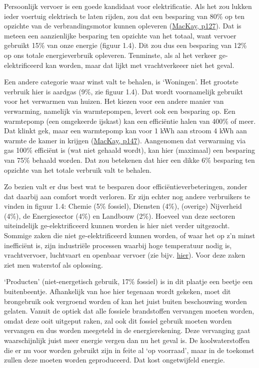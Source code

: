 \documentclass[
  11pt,
  a4paper,
]{book}
\begin{document}
Persoonlijk vervoer is een goede kandidaat voor elektrificatie. Als het zou lukken ieder voertuig elektrisch te laten rijden, zou dat een besparing van 80\% op ten opzichte van de verbrandingsmotor kunnen opleveren (\href{https://www.withouthotair.com/download.html}{MacKay, p127}). Dat is meteen een aanzienlijke besparing ten opzichte van het totaal, want vervoer gebruikt 15\% van onze energie (figuur 1.4). Dit zou dus een besparing van 12\% op ons totale energieverbruik opleveren. Tenminste, als al het verkeer ge-elektrificeerd kan worden, maar dat lijkt met vrachtverkeeer niet het geval.

Een andere categorie waar winst valt te behalen, is `Woningen'. Het grootste verbruik hier is aardgas (9\%, zie figuur 1.4). Dat wordt voornamelijk gebruikt voor het verwarmen van huizen. Het kiezen voor een andere manier van verwarming, namelijk via warmtepompen, levert ook een besparing op. Een warmtepomp (een omgekeerde ijskast) kan een efficiëntie halen van 400\% of meer. Dat klinkt gek, maar een warmtepomp kan voor 1 kWh aan stroom 4 kWh aan warmte de kamer in krijgen (\href{https://www.withouthotair.com/download.html}{MacKay, p147}). Aangenomen dat verwarming via gas 100\% efficiënt is (wat niet gehaald wordt), kan hier (maximaal) een besparing van 75\% behaald worden. Dat zou betekenen dat hier een dikke 6\% besparing ten opzichte van het totale verbruik valt te behalen.

Zo bezien valt er dus best wat te besparen door efficiëntieverbeteringen, zonder dat daarbij aan comfort wordt verloren. Er zijn echter nog andere verbruikers te vinden in figuur 1.4: Chemie (5\% fossiel), Diensten (4\%), (overige) Nijverheid (4\%), de Energiesector (4\%) en Landbouw (2\%). Hoeveel van deze sectoren uiteindelijk ge-elektrificeerd kunnen worden is hier niet verder uitgezocht. Sommige zaken die niet ge-elektrificeerd kunnen worden, of waar het op z'n minst inefficiënt is, zijn industriële processen waarbij hoge temperatuur nodig is, vrachtvervoer, luchtvaart en openbaar vervoer (zie bijv. \href{https://energypost.eu/which-sectors-need-hydrogen-which-dont-transport-heating-electricity-storage-industry/}{hier}). Voor deze zaken ziet men waterstof als oplossing.

`Producten' (niet-energetisch gebruik, 17\% fossiel) is in dit plaatje een beetje een buitenbeentje. Afhankelijk van hoe hier tegenaan wordt gekeken, moet dit brongebruik ook vergroend worden of kan het juist buiten beschouwing worden gelaten. Vanuit de optiek dat alle fossiele brandstoffen vervangen moeten worden, omdat deze ooit uitgeput raken, zal ook dit fossiel gebruik moeten worden vervangen en dus worden meegeteld in de energierekening. Deze vervanging gaat waarschijnlijk juist meer energie vergen dan nu het geval is. De koolwaterstoffen die er nu voor worden gebruikt zijn in feite al `op voorraad', maar in de toekomst zullen deze moeten worden geproduceerd. Dat kost ongetwijfeld energie.
\end{document}
